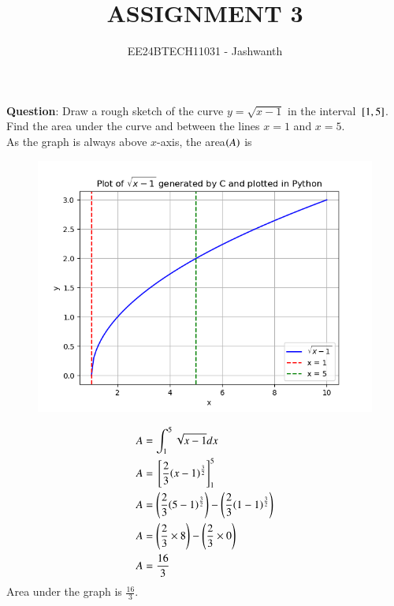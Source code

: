 \documentclass[journal,12pt,onecolumn]{IEEEtran}
\theoremstyle{remark}
\begin{document}

\vspace{3cm}

\title{ASSIGNMENT 3}
\author{EE24BTECH11031 - Jashwanth}
\maketitle

\bigskip

\textbf{Question}: Draw a rough sketch of the curve $y = \sqrt{x-1}$ in the interval ${}\left[1,5\right]$. Find the area under the curve and between the lines $x = 1$ and $x = 5$.\\
\solution
As the graph is always above $x$-axis, the area$\left(A\right)$ is \\
\begin{figure}[h]
	\centering
	\includegraphics[scale=0.8]{figs/fig-1.png}
	\label{Fig}
\end{figure}
\begin{align}
	A &= \int_{1}^{5} \sqrt{x-1} dx\\
	A &= {}\left[\frac{2}{3}{\left(x-1\right)}^{\frac{3}{2}}\right]_{1}^{5}\\
	A &= \left(\frac{2}{3}{\left(5-1\right)}^{\frac{3}{2}}\right)-\left(\frac{2}{3}{\left(1-1\right)}^{\frac{3}{2}}\right)\\
	A &= \left(\frac{2}{3}\times8\right)-\left(\frac{2}{3}\times0\right)\\
	A &= \frac{16}{3}\\
\end{align}
Area under the graph is $\frac{16}{3}$.
\end{document}
